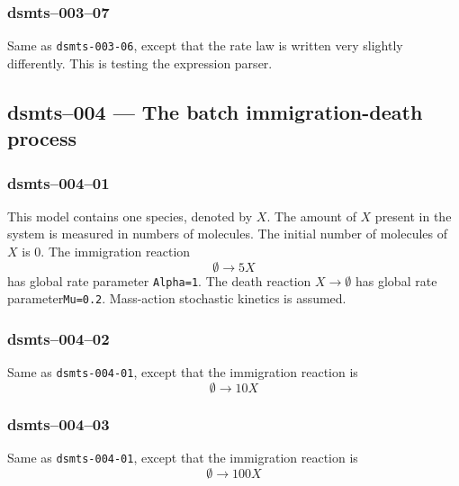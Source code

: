 
\subsubsection{dsmts--003--07} 

Same as \verb$dsmts-003-06$, except that the rate law is written very
slightly differently. This is testing the expression
parser.



\subsection{dsmts--004 --- The batch immigration-death process}

\subsubsection{dsmts--004--01}

This model contains one species, denoted by $X$. The amount of $X$
present in the system is measured in numbers of molecules. The initial
number of molecules of $X$ is $0$. The immigration reaction
\[
\emptyset \longrightarrow 5 X
\] 
has global rate parameter
\texttt{Alpha=1}. The death reaction $X\longrightarrow \emptyset$ has
global rate parameter\texttt{Mu=0.2}. Mass-action stochastic kinetics
is assumed.


\subsubsection{dsmts--004--02} 

Same as \verb$dsmts-004-01$, except that the immigration reaction is 
\[
\emptyset \longrightarrow 10 X
\] 


\subsubsection{dsmts--004--03} 

Same as \verb$dsmts-004-01$, except that the immigration reaction is 
\[
\emptyset \longrightarrow 100 X
\] 



